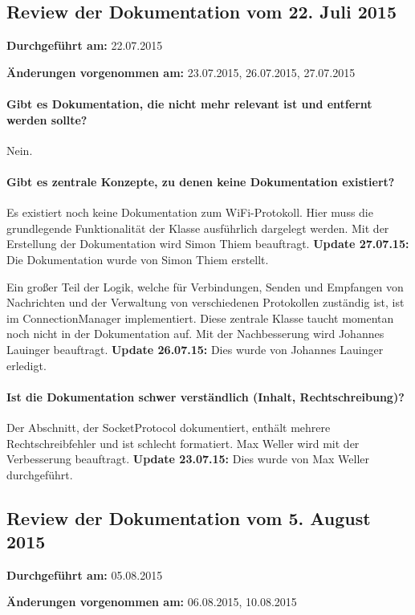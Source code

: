 \subsection{Review der Dokumentation vom 22. Juli 2015}

\textbf{Durchgeführt am:} 22.07.2015

\textbf{Änderungen vorgenommen am:} 23.07.2015, 26.07.2015, 27.07.2015

\paragraph{Gibt es Dokumentation, die nicht mehr relevant ist und entfernt werden sollte?}
Nein.

\paragraph{Gibt es zentrale Konzepte, zu denen keine Dokumentation existiert?}
Es existiert noch keine Dokumentation zum WiFi-Protokoll. Hier muss die grundlegende Funktionalität der Klasse ausführlich dargelegt werden. Mit der Erstellung der Dokumentation wird Simon Thiem beauftragt. \textbf{Update 27.07.15:} Die Dokumentation wurde von Simon Thiem erstellt.

Ein großer Teil der Logik, welche für Verbindungen, Senden und Empfangen von Nachrichten und der Verwaltung von verschiedenen Protokollen zuständig ist, ist im ConnectionManager implementiert. Diese zentrale Klasse taucht momentan noch nicht in der Dokumentation auf. Mit der Nachbesserung wird Johannes Lauinger beauftragt. \textbf{Update 26.07.15:} Dies wurde von Johannes Lauinger erledigt.

\paragraph{Ist die Dokumentation schwer verständlich (Inhalt, Rechtschreibung)?}
Der Abschnitt, der SocketProtocol dokumentiert, enthält mehrere Rechtschreibfehler und ist schlecht formatiert. Max Weller wird mit der Verbesserung beauftragt. \textbf{Update 23.07.15:} Dies wurde von Max Weller durchgeführt.


\subsection{Review der Dokumentation vom 5. August 2015}

\textbf{Durchgeführt am:} 05.08.2015

\textbf{Änderungen vorgenommen am:} 06.08.2015, 10.08.2015

